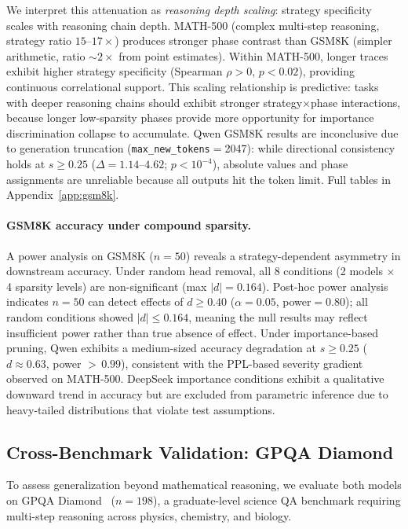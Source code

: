 We interpret this attenuation as \emph{reasoning depth scaling}: strategy specificity scales with reasoning chain depth. MATH-500 (complex multi-step reasoning, strategy ratio $15$--$17{\times}$) produces stronger phase contrast than GSM8K (simpler arithmetic, ratio ${\sim}2{\times}$ from point estimates). Within MATH-500, longer traces exhibit higher strategy specificity (Spearman $\rho > 0$, $p < 0.02$), providing continuous correlational support. This scaling relationship is predictive: tasks with deeper reasoning chains should exhibit stronger strategy${\times}$phase interactions, because longer low-sparsity phases provide more opportunity for importance discrimination collapse to accumulate. Qwen GSM8K results are inconclusive due to generation truncation (\texttt{max\_new\_tokens}${=}$2047): while directional consistency holds at $s \geq 0.25$ ($\Delta{=}1.14$--$4.62$; $p < 10^{-4}$), absolute values and phase assignments are unreliable because all outputs hit the token limit. Full tables in Appendix~\ref{app:gsm8k}.

\paragraph{GSM8K accuracy under compound sparsity.}
A power analysis on GSM8K ($n{=}50$) reveals a strategy-dependent asymmetry in downstream accuracy. Under random head removal, all 8 conditions (2 models $\times$ 4 sparsity levels) are non-significant (max $|d|{=}0.164$). Post-hoc power analysis indicates $n{=}50$ can detect effects of $d \geq 0.40$ ($\alpha{=}0.05$, power${=}0.80$); all random conditions showed $|d| \leq 0.164$, meaning the null results may reflect insufficient power rather than true absence of effect. Under importance-based pruning, Qwen exhibits a medium-sized accuracy degradation at $s \geq 0.25$ ($d \approx 0.63$, power ${>}\,0.99$), consistent with the PPL-based severity gradient observed on MATH-500. DeepSeek importance conditions exhibit a qualitative downward trend in accuracy but are excluded from parametric inference due to heavy-tailed distributions that violate test assumptions.

\subsection{Cross-Benchmark Validation: GPQA Diamond}
\label{sec:cross-benchmark-gpqa}

To assess generalization beyond mathematical reasoning, we evaluate both models on GPQA Diamond~\cite{rein-gpqa-2024} ($n{=}198$), a graduate-level science QA benchmark requiring multi-step reasoning across physics, chemistry, and biology.

